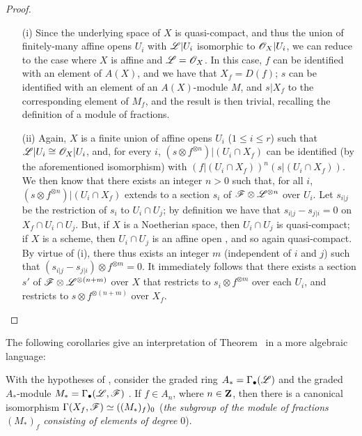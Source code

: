 \begin{proof}
\medskip\noindent
\begin{enumerate}
  \item[(i)] Since the underlying space of $X$ is quasi-compact, and thus the union of
    finitely-many affine opens $U_i$ with $\mathscr{L}|U_i$ isomorphic to
    $\mathscr{O}_X|U_i$, we can reduce to the case where $X$ is affine and $\mathscr{L}=\mathscr{O}_X$.
    In this case, $f$ can be identified with an element of $A(X)$, and we have that
    $X_f=D(f)$; $s$ can be identified with an element of an $A(X)$-module $M$, and
    $s|X_f$ to the corresponding element of $M_f$, and the result is then trivial,
    recalling the definition of a module of fractions.
  \item[(ii)] Again, $X$ is a finite union of affine opens $U_i$ ($1\leq i\leq r$)
    such that $\mathscr{L}|U_i\cong\mathscr{O}_X|U_i$, and, for every $i$,
    $(s\otimes f^{\otimes n})|(U_i\cap X_f)$ can be identified (by the aforementioned
    isomorphism) with $(f|(U_i\cap X_f))^n(s|(U_i\cap X_f))$. We then know
     that there exists an integer $n>0$ such that, for all
    $i$, $(s\otimes f^{\otimes n})|(U_i\cap X_f)$ extends to a section $s_i$ of
    $\mathscr{F}\otimes\mathscr{L}^{\otimes n}$ over $U_i$. Let $s_{i|j}$ be the restriction
    of $s_i$ to $U_i\cap U_j$; by definition we have that $s_{i|j}-s_{j|i}=0$ on
    $X_f\cap U_i\cap U_j$. But, if $X$ is a Noetherian space, then $U_i\cap U_j$ is
    quasi-compact; if $X$ is a scheme, then $U_i\cap U_j$ is an affine open
    , and so again quasi-compact. By virtue of (i), there thus
    exists an integer $m$ (independent of $i$ and $j$) such that
    $(s_{i|j}-s_{j|i})\otimes f^{\otimes m}=0$. It immediately follows that there
    exists a section $s'$ of $\mathscr{F}\otimes\mathscr{L}^{\otimes(n+m)}$ over $X$ that
    restricts to $s_i\otimes f^{\otimes m}$ over each $U_i$, and restricts to
    $s\otimes f^{\otimes(n+m)}$ over $X_f$.
\end{enumerate}
\end{proof}

The following corollaries give an interpretation of Theorem~ in a more
algebraic language:
\begin{corollary}[9.3.2]
\label{I.9.3.2}
With the hypotheses of , consider the graded ring $A_*=\Gamma_\bullet(\mathscr{L})$
and the graded $A_*$-module $M_*=\Gamma_\bullet(\mathscr{L},\mathscr{F})$ . If $f\in A_n$,
where $n\in\mathbf{Z}$, then there is a canonical isomorphism
$\Gamma(X_f,\mathscr{F})\simeq((M_*)_f)_0$ (\emph{the subgroup of the module of
fractions $(M_*)_f$ consisting of elements of degree $0$}).
\end{corollary}

